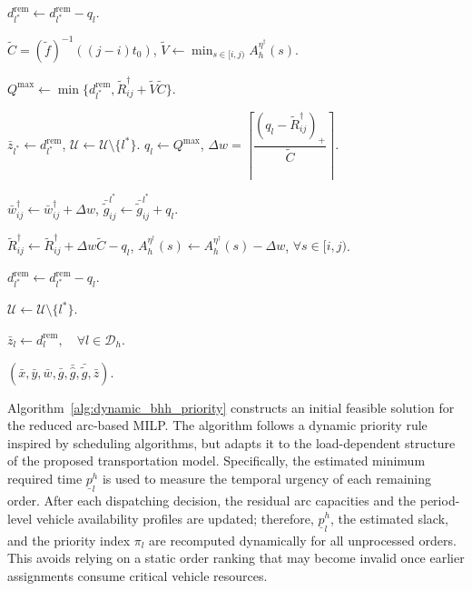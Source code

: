 \documentclass[10pt, reqno]{amsart}
\begin{document}
\begin{algorithm}[!htbp]
\begin{algorithmic}[1]
            \State
            $d_{l^*}^{\mathrm{rem}}
            \leftarrow
            d_{l^*}^{\mathrm{rem}}-q_l$.
        \EndIf


        \State
        $\widetilde C=(\widetilde f)^{-1}((j-i)t_0)$,
        $\widetilde V\leftarrow \min_{s\in[i,j)}A_h^{\eta^\dagger}(s)$.

        \State
        $Q^{\max}
        \leftarrow
        \min\{
        d_{l^*}^{\mathrm{rem}},
        \widetilde R_{ij}^{\dagger}
        +\widetilde V\widetilde C
        \}$.

            $\bar z_{l^*}\leftarrow d_{l^*}^{\mathrm{rem}}$,
            $\mathcal U\leftarrow\mathcal U\setminus\{l^*\}$.
        \Else
            \State
            $q_l\leftarrow Q^{\max}$,
            $\Delta w
            =
            \left\lceil
            \dfrac{(q_l-\widetilde R_{ij}^{\dagger})_+}{\widetilde C}
            \right\rceil$.

            \State
            $\bar w_{ij}^{\dagger}
            \leftarrow
            \bar w_{ij}^{\dagger}+\Delta w$,
            $\bar{\widetilde g}_{ij}^{l^*}
            \leftarrow
            \bar{\widetilde g}_{ij}^{l^*}+q_l$.

            \State
            $\widetilde R_{ij}^{\dagger}
            \leftarrow
            \widetilde R_{ij}^{\dagger}+\Delta w\widetilde C-q_l$,
            $A_h^{\eta^\dagger}(s)
            \leftarrow
            A_h^{\eta^\dagger}(s)-\Delta w$,
            $\forall s\in[i,j)$.

            \State
            $d_{l^*}^{\mathrm{rem}}
            \leftarrow
            d_{l^*}^{\mathrm{rem}}-q_l$.
        \EndIf

    \EndIf

        $\mathcal U\leftarrow\mathcal U\setminus\{l^*\}$.
    \EndIf

\EndWhile

\State
$\bar z_l\leftarrow d_l^{\mathrm{rem}},\quad \forall l\in\mathcal D_h$.

\State \Return
$(\bar x,\bar y,\bar w,\bar g,\bar{\widehat g},\bar{\widetilde g},\bar z)$.

\end{algorithmic}
\end{algorithm}
Algorithm~\ref{alg:dynamic_bhh_priority} constructs an initial feasible solution for the reduced arc-based MILP. The algorithm follows a dynamic priority rule inspired by scheduling algorithms, but adapts it to the load-dependent structure of the proposed transportation model. Specifically, the estimated minimum required time $\underline p_l^h$ is used to measure the temporal urgency of each remaining order. After each dispatching decision, the residual arc capacities and the period-level vehicle availability profiles are updated; therefore, $\underline p_l^h$, the estimated slack, and the priority index $\pi_l$ are recomputed dynamically for all unprocessed orders. This avoids relying on a static order ranking that may become invalid once earlier assignments consume critical vehicle resources.
\end{document}
